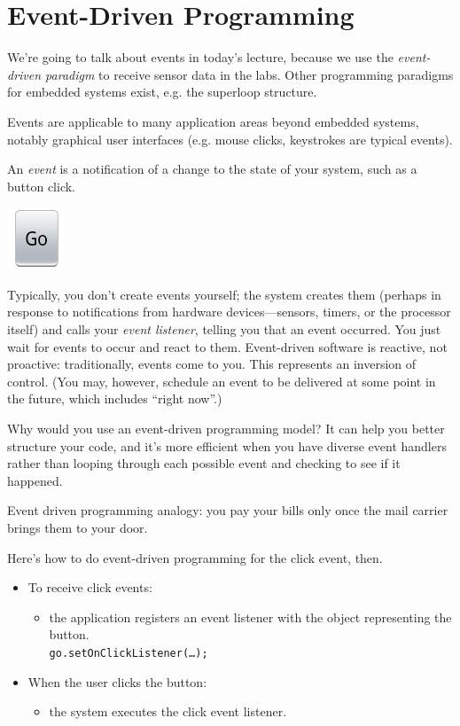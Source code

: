 



\section*{Event-Driven Programming}
We're going to talk about events in today's lecture, because we use
the \emph{event-driven paradigm} to receive sensor data in the labs.  Other programming paradigms for
embedded systems exist, e.g. the superloop structure.

Events are applicable to many application areas beyond embedded
systems, notably graphical user interfaces (e.g. mouse clicks,
keystrokes are typical events).

An \emph{event} is a notification of a change to the state of your system, such 
as a button click.

\begin{center}
\includegraphics{images/go-button}
\end{center}

Typically, you don't create events yourself; the system creates them
(perhaps in response to notifications from hardware devices---sensors,
timers, or the processor itself) and calls your \emph{event listener}, telling
you that an event occurred. You just wait for events to occur and react
to them. Event-driven software is reactive, not proactive:
traditionally, events come to you. This represents an 
inversion of control. (You may, however, schedule an event to be delivered
at some point in the future, which includes ``right now''.)

Why would you use an event-driven programming model? It can help you better structure your code, and it's more efficient when you have diverse event handlers rather than
looping through each possible event and checking to see if it happened.

Event driven programming analogy: you pay your bills only once the mail carrier brings them to your door.

Here's how to do event-driven programming for the click event, then.
\begin{itemize}
\item To receive click events: 
\begin{itemize} \item the application registers an event 
listener with the object representing the button.\\
{\tt \qquad go.setOnClickListener(\ldots);}
\end{itemize}
\item When the user clicks the button: 
\begin{itemize}
\item the system executes the click event listener.
\end{itemize}
\end{itemize}

